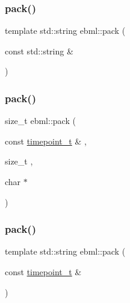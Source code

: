 \subsubsection{\texorpdfstring{pack()}{pack()}\hspace{0.1cm}{\footnotesize\ttfamily [12/18]}}
{\footnotesize\ttfamily template std\+::string ebml\+::pack (\begin{DoxyParamCaption}\item[{const std\+::string \&}]{ }\end{DoxyParamCaption})}

\mbox{\label{namespaceebml_a1878818f2cc11ea62ecab6513bc7e9d1}} 
\subsubsection{\texorpdfstring{pack()}{pack()}\hspace{0.1cm}{\footnotesize\ttfamily [13/18]}}
{\footnotesize\ttfamily size\+\_\+t ebml\+::pack (\begin{DoxyParamCaption}\item[{const \mbox{\hyperlink{namespaceebml_a7e667ec3fe8b51fb5b8f9690734d8638}{timepoint\+\_\+t}} \&}]{,  }\item[{size\+\_\+t}]{,  }\item[{char $\ast$}]{ }\end{DoxyParamCaption})}

\mbox{\label{namespaceebml_a5f46d1f43787604ff84e25a0115d08cd}} 
\subsubsection{\texorpdfstring{pack()}{pack()}\hspace{0.1cm}{\footnotesize\ttfamily [14/18]}}
{\footnotesize\ttfamily template std\+::string ebml\+::pack (\begin{DoxyParamCaption}\item[{const \mbox{\hyperlink{namespaceebml_a7e667ec3fe8b51fb5b8f9690734d8638}{timepoint\+\_\+t}} \&}]{ }\end{DoxyParamCaption})}

\mbox{\label{namespaceebml_a0292a5a59fc28b1537dcf2d1e2c9cf2d}} 
